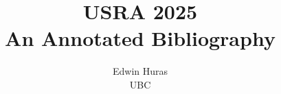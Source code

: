 \documentclass [11pt]{article}
\title{USRA 2025\\\medskip An Annotated Bibliography}
\author{Edwin Huras\\UBC}
\begin{document}
\maketitle
\nocite{*}


\end{document}
